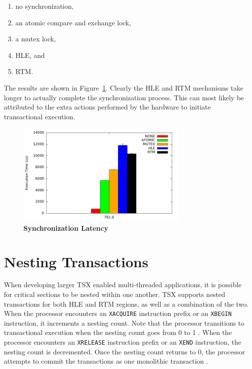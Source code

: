 \documentclass[11pt]{book}
\begin{document}
\vspace*{-\bigskipamount}
\begin{singlespace}
\begin{enumerate}
  \item no synchronization,
  \item an atomic compare and exchange lock,
  \item a mutex lock,
  \item HLE, and
  \item RTM.
\end{enumerate}
\end{singlespace}

\noindent
The results are shown in Figure~\ref{fig:tsx_latency}.  Clearly the HLE and RTM mechanisms
take longer to actually complete the synchronization process.  This can most likely be
attributed to the extra actions performed by the hardware to initiate transactional
execution.

\begin{figure}
    \centering
    \graphicspath{ {./figures/} }
    \includegraphics[width=0.75\textwidth,keepaspectratio]{SyncBM}
    \caption{\textbf{Synchronization Latency}}\label{fig:tsx_latency}
\end{figure}

\section{Nesting Transactions}

When developing larger TSX enabled multi-threaded applications, it is possible for
critical sections to be nested within one another.  TSX supports nested transactions for
both HLE and RTM regions, as well as a combination of the two.  When the processor
encounters an \texttt{XACQUIRE} instruction prefix or an \texttt{XBEGIN} instruction, it
increments a nesting count.  Note that the processor transitions to transactional
execution when the nesting count goes from 0 to 1 \cite{intel_prog_ref}.  When the
processor encounters an \texttt{XRELEASE} instruction prefix or an \texttt{XEND}
instruction, the nesting count is decremented.  Once the nesting count returns to 0, the
processor attempts to commit the transactions as one monolithic transaction
\cite{intel_prog_ref}.
\end{document}
